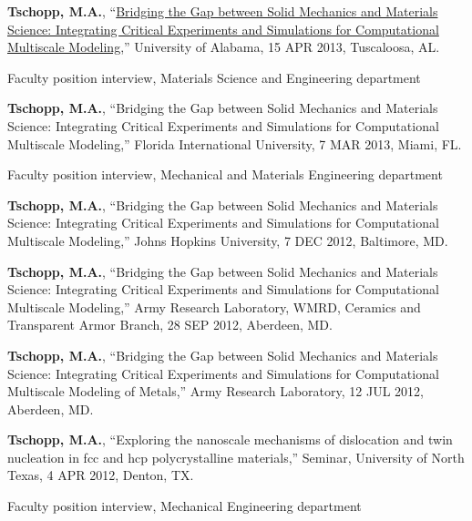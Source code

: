 \begin{cvlist}
\item
\textbf{Tschopp, M.A.}, ``\href{http://dx.doi.org/10.13140/2.1.3417.6808}{Bridging the Gap between Solid Mechanics and Materials Science: Integrating Critical Experiments and Simulations for Computational Multiscale Modeling},'' University of Alabama, 15 APR 2013, Tuscaloosa, AL.
\begin{list2}
\item[$\star$] Faculty position interview, Materials Science and Engineering department
\end{list2}

\item
\textbf{Tschopp, M.A.}, ``Bridging the Gap between Solid Mechanics and Materials Science: Integrating Critical Experiments and Simulations for Computational Multiscale Modeling,'' Florida International University, 7 MAR 2013, Miami, FL.
\begin{list2}
\item[$\star$] Faculty position interview, Mechanical and Materials Engineering department
\end{list2}

\item
\textbf{Tschopp, M.A.}, ``Bridging the Gap between Solid Mechanics and Materials Science: Integrating Critical Experiments and Simulations for Computational Multiscale Modeling,'' Johns Hopkins University, 7 DEC 2012, Baltimore, MD.

\item
\textbf{Tschopp, M.A.}, ``Bridging the Gap between Solid Mechanics and Materials Science: Integrating Critical Experiments and Simulations for Computational Multiscale Modeling,'' Army Research Laboratory, WMRD, Ceramics and Transparent Armor Branch, 28 SEP 2012, Aberdeen, MD.

\item
\textbf{Tschopp, M.A.}, ``Bridging the Gap between Solid Mechanics and Materials Science: Integrating Critical Experiments and Simulations for Computational Multiscale Modeling of Metals,'' Army Research Laboratory, 12 JUL 2012, Aberdeen, MD.

\item
\textbf{Tschopp, M.A.}, ``Exploring the nanoscale mechanisms of dislocation and twin nucleation in fcc and hcp polycrystalline materials,'' Seminar, University of North Texas, 4 APR 2012, Denton, TX.
\begin{list2}
\item[$\star$] Faculty position interview, Mechanical Engineering department
\end{list2}


\end{cvlist}
